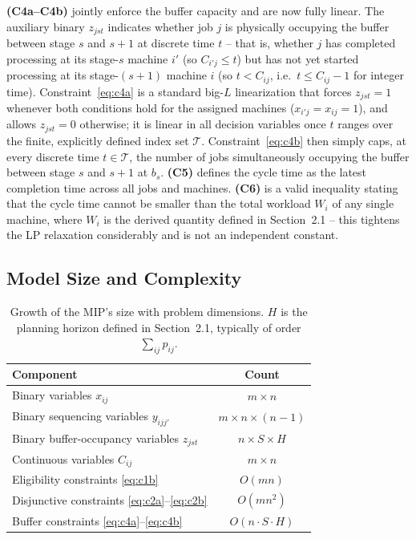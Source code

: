 \documentclass[11pt,a4paper]{article}
\begin{document}
\textbf{(C4a--C4b)} jointly enforce the buffer capacity and are now fully
linear. The auxiliary binary $z_{jst}$ indicates whether job $j$ is
physically occupying the buffer between stage $s$ and $s+1$ at discrete
time $t$ -- that is, whether $j$ has completed processing at its
stage-$s$ machine $i'$ (so $C_{i'j} \le t$) but has not yet started
processing at its stage-$(s{+}1)$ machine $i$ (so $t < C_{ij}$, i.e.\
$t \le C_{ij}-1$ for integer time). Constraint~\eqref{eq:c4a} is a
standard big-$L$ linearization that forces $z_{jst}=1$ whenever both
conditions hold for the assigned machines ($x_{i'j}=x_{ij}=1$), and
allows $z_{jst}=0$ otherwise; it is linear in all decision variables once
$t$ ranges over the finite, explicitly defined index set $\mathcal{T}$.
Constraint~\eqref{eq:c4b} then simply caps, at every discrete time
$t \in \mathcal{T}$, the number of jobs simultaneously occupying the
buffer between stage $s$ and $s+1$ at $b_s$. \textbf{(C5)} defines the
cycle time as the latest completion time across all jobs and machines.
\textbf{(C6)} is a valid inequality stating that the cycle time cannot be
smaller than the total workload $W_i$ of any single machine, where $W_i$
is the derived quantity defined in Section~2.1 -- this tightens the LP
relaxation considerably and is not an independent constant.

\subsection{Model Size and Complexity}

\begin{table}[h!]
\centering
\begin{tabular}{@{}lc@{}}
\toprule
Component & Count \\
\midrule
Binary variables $x_{ij}$ & $m \times n$ \\
Binary sequencing variables $y_{ijj'}$ & $m \times n \times (n-1)$ \\
Binary buffer-occupancy variables $z_{jst}$ & $n \times S \times H$ \\
Continuous variables $C_{ij}$ & $m \times n$ \\
Eligibility constraints \eqref{eq:c1b} & $O(mn)$ \\
Disjunctive constraints \eqref{eq:c2a}--\eqref{eq:c2b} & $O(m n^2)$ \\
Buffer constraints \eqref{eq:c4a}--\eqref{eq:c4b} & $O(n \cdot S \cdot H)$ \\
\bottomrule
\end{tabular}
\caption{Growth of the MIP's size with problem dimensions. $H$ is the
  planning horizon defined in Section~2.1, typically of order $\sum_{ij}
  p_{ij}$.}
\end{table}
\end{document}
